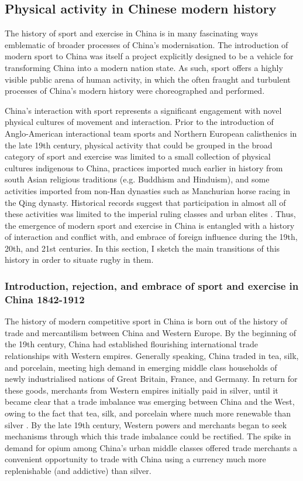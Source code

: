 \begin{CJK}{UTF8}{gbsn}
\subsection{Physical activity in Chinese modern history}
The history of sport and exercise in China is in many fascinating ways emblematic of broader processes of China's modernisation.  The introduction of modern sport to China was itself a project explicitly designed to be a vehicle for transforming China into a modern nation state.  As such, sport offers a highly visible public arena of human activity, in which the often fraught and turbulent processes of China's modern history were choreographed and performed.

China's interaction with sport represents a significant engagement with novel physical cultures of movement and interaction.  Prior to the introduction of Anglo-American interactional team sports and Northern European calisthenics in the late 19th century, physical activity that could be grouped in the broad category of sport and exercise was limited to a small collection of physical cultures indigenous to China, practices imported much earlier in history from south Asian religious traditions (e.g. Buddhism and Hinduism), and some activities imported from non-Han dynasties such as Manchurian horse racing in the Qing dynasty.  Historical records suggest that participation in almost all of these activities was limited to the imperial ruling classes and urban elites \citep{Ge2005}.  Thus, the emergence of modern sport and exercise in China is entangled with a history of interaction and conflict with, and embrace of foreign influence during the 19th, 20th, and 21st centuries.  In this section, I sketch the main transitions of this history in order to situate rugby in them.

  \subsubsection{Introduction, rejection, and embrace of sport and exercise in China 1842-1912 \label{sect:introEnMasse}}

The history of modern competitive sport in China is born out of the history of trade and mercantilism between China and Western Europe.
By the beginning of the 19th century, China had established flourishing international trade relationships with Western empires.  Generally speaking, China traded in tea, silk, and porcelain, meeting high demand in emerging middle class households of newly industrialised nations of Great Britain, France, and Germany.  In return for these goods, merchants from Western empires initially paid in silver, until it became clear that a trade imbalance was emerging between China and the West, owing to the fact that tea, silk, and porcelain where much more renewable than silver \citep{Fay2000}.  By the late 19th century, Western powers and merchants began to seek mechanisms through which this trade imbalance could be rectified.  The spike in demand for opium among China's urban middle classes offered trade merchants a convenient opportunity to trade with China using a currency much more replenishable (and addictive) than silver.


\end{CJK}
